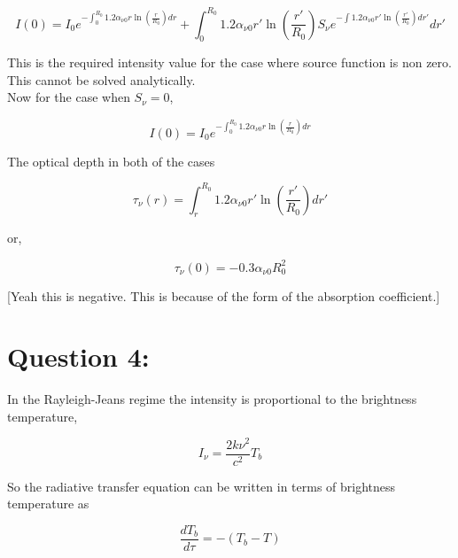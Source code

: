 \documentclass{article}
\begin{document}
\begin{equation}
\boxed{
I(0)
=
I_0 e^{-\int_{0}^{R_0}1.2\alpha_{\nu0} r\ln\left(\frac{r}{R_0}\right) dr}
+
\int_0^{R_0}
1.2\alpha_{\nu0} r'\ln\left(\frac{r'}{R_0}\right) S_\nu
e^{-\int1.2\alpha_{\nu0} r'\ln\left(\frac{r'}{R_0}\right) dr'} dr'
}
\end{equation}

This is the required intensity value for the case where source function is non zero.
This cannot be solved analytically.\\

Now for the case when $S_\nu=0$,

\begin{equation}
\boxed{
I(0)=I_0 e^{-\int_{0}^{R_0}1.2\alpha_{\nu0} r\ln\left(\frac{r}{R_0}\right) dr}
}
\end{equation}

The optical depth in both of the cases

\begin{equation}
\tau_\nu(r)=\int_r^{R_0}1.2\alpha_{\nu0} r'\ln\left(\frac{r'}{R_0}\right) dr'
\end{equation}

or, 

\begin{equation}
\boxed{
\tau_\nu(0)=-0.3\alpha_{\nu0}R_0^2
}
\end{equation}

[Yeah this is negative. This is because of the form of the absorption coefficient.]





\section{Question 4:}

In the Rayleigh-Jeans regime the intensity is proportional to the brightness temperature,

\begin{equation}
I_\nu = \frac{2k\nu^2}{c^2}T_b
\end{equation}

So the radiative transfer equation can be written in terms of brightness temperature as

\begin{equation}
\frac{dT_b}{d\tau}=-(T_b-T)
\end{equation}
\end{document}
